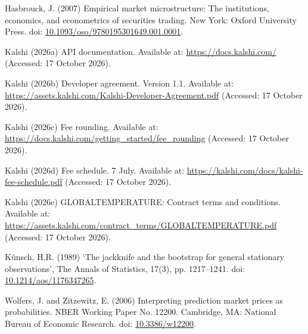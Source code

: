 {\needspace{44pt}\hypertarget{ref:hasbrouck2007}{}\noindent\hangindent=15pt Hasbrouck, J. (2007) Empirical market microstructure: The institutions, economics, and econometrics of securities trading. New York: Oxford University Press. doi: \url{10.1093/oso/9780195301649.001.0001}.\par\vspace{3pt}
\needspace{44pt}\hypertarget{ref:kalshi2026a}{}\noindent\hangindent=15pt Kalshi (2026a) API documentation. Available at: \url{https://docs.kalshi.com/} (Accessed: 17 October 2026).\par\vspace{3pt}
\needspace{44pt}\hypertarget{ref:kalshi2026d}{}\noindent\hangindent=15pt Kalshi (2026b) Developer agreement. Version 1.1. Available at: \url{https://assets.kalshi.com/Kalshi-Developer-Agreement.pdf} (Accessed: 17 October 2026).\par\vspace{3pt}
\needspace{44pt}\hypertarget{ref:kalshi2026e}{}\noindent\hangindent=15pt Kalshi (2026c) Fee rounding. Available at: \url{https://docs.kalshi.com/getting_started/fee_rounding} (Accessed: 17 October 2026).\par\vspace{3pt}
\needspace{44pt}\hypertarget{ref:kalshi2026b}{}\noindent\hangindent=15pt Kalshi (2026d) Fee schedule. 7 July. Available at: \url{https://kalshi.com/docs/kalshi-fee-schedule.pdf} (Accessed: 17 October 2026).\par\vspace{3pt}
\needspace{44pt}\hypertarget{ref:kalshi2026c}{}\noindent\hangindent=15pt Kalshi (2026e) GLOBALTEMPERATURE: Contract terms and conditions. Available at: \url{https://assets.kalshi.com/contract_terms/GLOBALTEMPERATURE.pdf} (Accessed: 17 October 2026).\par\vspace{3pt}
\needspace{44pt}\hypertarget{ref:kunsch1989}{}\noindent\hangindent=15pt Künsch, H.R. (1989) ‘The jackknife and the bootstrap for general stationary observations’, The Annals of Statistics, 17(3), pp. 1217--1241. doi: \url{10.1214/aos/1176347265}.\par\vspace{3pt}
\needspace{44pt}\hypertarget{ref:wolfers2006}{}\noindent\hangindent=15pt Wolfers, J. and Zitzewitz, E. (2006) Interpreting prediction market prices as probabilities. NBER Working Paper No. 12200. Cambridge, MA: National Bureau of Economic Research. doi: \url{10.3386/w12200}.\par\vspace{3pt}
}
